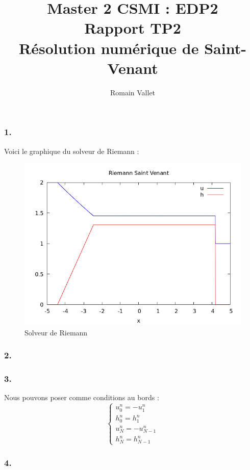 \documentclass{article}
\title{Master 2 CSMI : EDP2\\Rapport TP2\\Résolution numérique de Saint-Venant}
\author{Romain Vallet}
\begin{document}
\maketitle

\subsubsection*{1.}

Voici le graphique du solveur de Riemann :

\begin{figure}[H]
    \centering
    \includegraphics[scale=0.5]{figure/riemann.png}
    \caption{Solveur de Riemann}
\end{figure}

\subsubsection*{2.}

\subsubsection*{3.}

Nous pouvons poser comme conditions au bords :
\[ \left\{ \begin{matrix} 
    u_0^n = - u_1^n \\
    h_0^n = h_1^n \\
    u_N^n = - u_{N-1}^n \\
    h_N^n = h_{N-1}^n
\end{matrix} \right. \]

\subsubsection*{4.}
\end{document}

